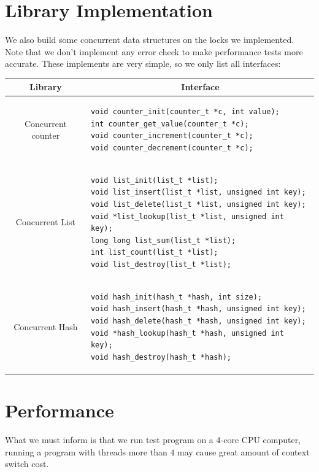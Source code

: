 \documentclass{article}
\begin{document}
\section{Library Implementation}
We also build some concurrent data structures on the locks we implemented. Note that we don't implement any error check to make performance tests more accurate. These implements are very simple, so we only list all interfaces:
\begin{center}
\begin{tabular}{c|l}
\hline
Library&\multicolumn{1}{c}{Interface}\\
\hline
Concurrent counter&
\begin{lstlisting}
void counter_init(counter_t *c, int value);
int counter_get_value(counter_t *c);
void counter_increment(counter_t *c);
void counter_decrement(counter_t *c);
\end{lstlisting}\\
\hline
Concurrent List&
\begin{lstlisting}
void list_init(list_t *list);
void list_insert(list_t *list, unsigned int key);
void list_delete(list_t *list, unsigned int key);
void *list_lookup(list_t *list, unsigned int key);
long long list_sum(list_t *list);
int list_count(list_t *list);
void list_destroy(list_t *list);
\end{lstlisting}\\
\hline
Concurrent Hash&
\begin{lstlisting}
void hash_init(hash_t *hash, int size);
void hash_insert(hash_t *hash, unsigned int key);
void hash_delete(hash_t *hash, unsigned int key);
void *hash_lookup(hash_t *hash, unsigned int key);
void hash_destroy(hash_t *hash);
\end{lstlisting}\\
\hline
\end{tabular}
\end{center}


\section{Performance}
What we must inform is that we run test program on a 4-core CPU computer, running a program with threads more than $4$ may cause great amount of context switch cost.
\end{document}
